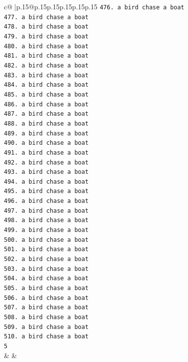 \documentclass{article}
\begin{document}
{\begin{supertabular}{c@{$\;$}|p{.15\linewidth}@{}p{.15\linewidth}p{.15\linewidth}p{.15\linewidth}p{.15\linewidth}p{.15\linewidth}}
{{{\texttt{476. a bird chase a boat} \\
\texttt{477. a bird chase a boat} \\
\texttt{478. a bird chase a boat} \\
\texttt{479. a bird chase a boat} \\
\texttt{480. a bird chase a boat} \\
\texttt{481. a bird chase a boat} \\
\texttt{482. a bird chase a boat} \\
\texttt{483. a bird chase a boat} \\
\texttt{484. a bird chase a boat} \\
\texttt{485. a bird chase a boat} \\
\texttt{486. a bird chase a boat} \\
\texttt{487. a bird chase a boat} \\
\texttt{488. a bird chase a boat} \\
\texttt{489. a bird chase a boat} \\
\texttt{490. a bird chase a boat} \\
\texttt{491. a bird chase a boat} \\
\texttt{492. a bird chase a boat} \\
\texttt{493. a bird chase a boat} \\
\texttt{494. a bird chase a boat} \\
\texttt{495. a bird chase a boat} \\
\texttt{496. a bird chase a boat} \\
\texttt{497. a bird chase a boat} \\
\texttt{498. a bird chase a boat} \\
\texttt{499. a bird chase a boat} \\
\texttt{500. a bird chase a boat} \\
\texttt{501. a bird chase a boat} \\
\texttt{502. a bird chase a boat} \\
\texttt{503. a bird chase a boat} \\
\texttt{504. a bird chase a boat} \\
\texttt{505. a bird chase a boat} \\
\texttt{506. a bird chase a boat} \\
\texttt{507. a bird chase a boat} \\
\texttt{508. a bird chase a boat} \\
\texttt{509. a bird chase a boat} \\
\texttt{510. a bird chase a boat} \\
\texttt{5} \\
            }
        }
    }
    & & \\ \\


\end{supertabular}}
\end{document}
